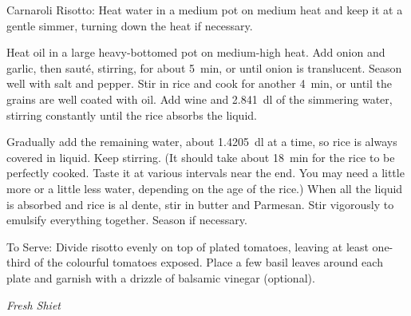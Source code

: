 \documentclass[a4paper]{article}
\newenvironment{instructions}[1]{\noindent\textsf{\textcolor{emphasis}{#1:}}}{\vspace{1ex}}
\begin{document}
\begin{minipage}[t][0.9\textheight]{0.8\textwidth}
        \begin{instructions}{Carnaroli Risotto}
                Heat water in a medium pot on medium heat and keep it at a
                gentle simmer, turning down the heat if necessary.

                Heat oil in a large heavy-bottomed pot on medium-high heat. Add
                onion and garlic, then sauté, stirring, for about \SI{5}{min},
                or until onion is translucent.  Season well with salt and
                pepper. Stir in rice and cook for another \SI{4}{min}, or until
                the grains are well coated with oil. Add wine and
                \SI{2.841}{dl} of the simmering water, stirring constantly
                until the rice absorbs the liquid.

                Gradually add the remaining water, about \SI{1.4205}{dl} at a
                time, so rice is always covered in liquid. Keep stirring. (It
                should take about \SI{18}{min} for the rice to be perfectly
                cooked.  Taste it at various intervals near the end. You may
                need a little more or a little less water, depending on the age
                of the rice.) When all the liquid is absorbed and rice is al
                dente, stir in butter and Parmesan.  Stir vigorously to
                emulsify everything together. Season if necessary.

        \end{instructions}

        \begin{instructions}{To Serve}
                Divide risotto evenly on top of plated tomatoes, leaving at
                least one-third of the colourful tomatoes exposed. Place a few
                basil leaves around each plate and garnish with a drizzle of
                balsamic vinegar (optional).
        \end{instructions}

        \vfill
        {\centering\textit{\textcolor{emphasis}{Fresh Shiet}}\\}
\end{minipage}
\end{document}
